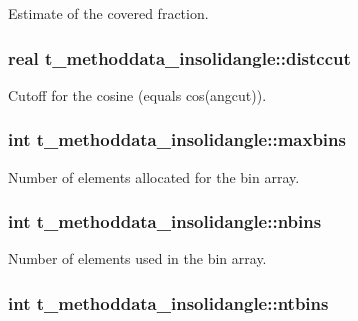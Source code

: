 \-Estimate of the covered fraction. \hypertarget{structt__methoddata__insolidangle_a234cd100cd11ba3d20e20d76ac5904ef}{
\subsubsection[{distccut}]{\setlength{\rightskip}{0pt plus 5cm}real {\bf t\-\_\-methoddata\-\_\-insolidangle\-::distccut}}}\label{structt__methoddata__insolidangle_a234cd100cd11ba3d20e20d76ac5904ef}
\-Cutoff for the cosine (equals cos(angcut)). \hypertarget{structt__methoddata__insolidangle_ab194fb34e21d1bdd0ec1a164b3b450fa}{
\subsubsection[{maxbins}]{\setlength{\rightskip}{0pt plus 5cm}int {\bf t\-\_\-methoddata\-\_\-insolidangle\-::maxbins}}}\label{structt__methoddata__insolidangle_ab194fb34e21d1bdd0ec1a164b3b450fa}
\-Number of elements allocated for the {\ttfamily bin} array. \hypertarget{structt__methoddata__insolidangle_ac44bee3216d6184122d8c0616c044c1d}{
\subsubsection[{nbins}]{\setlength{\rightskip}{0pt plus 5cm}int {\bf t\-\_\-methoddata\-\_\-insolidangle\-::nbins}}}\label{structt__methoddata__insolidangle_ac44bee3216d6184122d8c0616c044c1d}
\-Number of elements used in the {\ttfamily bin} array. \hypertarget{structt__methoddata__insolidangle_a1b6d5bed4a9c9a7d17b5956ee28b13e8}{
\subsubsection[{ntbins}]{\setlength{\rightskip}{0pt plus 5cm}int {\bf t\-\_\-methoddata\-\_\-insolidangle\-::ntbins}}}\label{structt__methoddata__insolidangle_a1b6d5bed4a9c9a7d17b5956ee28b13e8}
